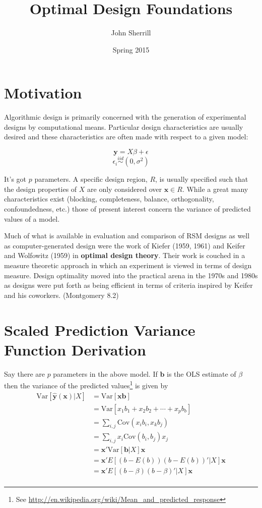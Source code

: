 \documentclass{article}\usepackage[]{graphicx}\usepackage[]{color}
\title{\vspace{-70pt} Optimal Design Foundations \vspace{-10pt}}
\author{John Sherrill\vspace{-20pt}}
\date{Spring 2015 \vspace{-10pt}}
\newcommand{\Var}{\mathrm{Var}}
\newcommand{\Cov}{\mathrm{Cov}}
\begin{document}
\maketitle

\section{Motivation}

Algorithmic design is primarily concerned with the generation of experimental designs by computational means. Particular design characteristics are usually desired and these characteristics are often made with respect to a given model:

$$ \textbf{y} = X\beta + \epsilon $$
$$ \epsilon_i \stackrel{iid}{\sim} (0, \sigma^2) $$

It's got $p$ parameters. A specific design region, $R$, is usually specified such that the design properties of $X$ are only considered over $\textbf{x} \in R$. While a great many characteristics exist (blocking, completeness, balance, orthogonality, confoundedness, etc.) those of present interest concern the variance of predicted values of a model.

Much of what is available in evaluation and comparison of RSM designs as well as computer-generated design were the work of Kiefer (1959, 1961) and Keifer and Wolfowitz (1959) in \textbf{optimal design theory}. Their work is couched in a measure theoretic approach in which an experiment is viewed in terms of design measure. Design optimality moved into the practical arena in the 1970s and 1980s as designs were put forth as being efficient in terms of criteria inspired by Keifer and his coworkers. (Montgomery 8.2)

\section{Scaled Prediction Variance Function Derivation}

Say there are $p$ parameters in the above model. If $\textbf{b}$ is the OLS estimate of $\beta$ then the variance of the predicted values\footnote{See \url{http://en.wikipedia.org/wiki/Mean_and_predicted_response}} is given by
\begin{align*}
  \Var[\hat{\textbf{y}}(\textbf{x}) | X] &= \Var[\textbf{xb}] \\
  &= \Var[x_1 b_1 + x_2 b_2 + \cdots + x_p b_b] \\
  &= \sum_{i,j} \Cov(x_i b_i, x_k b_j) \\
  &= \sum_{i,j} x_i \Cov(b_i, b_j) x_j \\
  &= \textbf{x}' \Var[\textbf{b} | X] \textbf{x} \\
  &= \textbf{x}' E[(b-E(b)) (b-E(b))' | X] \textbf{x} \\
  &= \textbf{x}' E[(b-\beta)(b-\beta)' | X] \textbf{x} \\
\end{align*}
\end{document}
